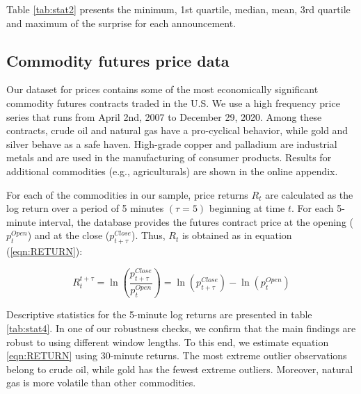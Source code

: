 \documentclass[12pt]{article}
\begin{document}
Table \ref{tab:stat2} presents the minimum, 1st quartile, median, mean, 3rd quartile and maximum of the surprise for each announcement. 



\subsection{Commodity futures price data}

Our dataset for prices contains some of the most economically significant commodity futures contracts traded in the U.S. We use a high frequency price series that runs from April 2nd, 2007 to December 29, 2020. Among these contracts, crude oil and natural gas have a pro-cyclical behavior, while gold and silver behave as a safe haven. High-grade copper and palladium are industrial metals and are used in the manufacturing of consumer products. Results for additional commodities (e.g., agriculturals) are shown in the online appendix.


For each of the commodities in our sample, price returns $R_t$ are calculated as the log return over a period of 5 minutes $(\tau=5)$ beginning at time $t$. For each 5-minute interval, the database provides the futures contract price at the opening ($p_{t}^{Open}$)  and at the close ($p_{t+\tau}^{Close}$). Thus, $R_t$ is obtained  as in equation (\ref{eqn:RETURN}):

\begin{equation}\label{eqn:RETURN}
R_t^{t+\tau}=\ln \left( \frac{p_{t+\tau}^{Close}}{p_{t}^{Open}} \right)=\ln (p_{t+\tau}^{Close})-\ln(p_{t}^{Open})
\end{equation}

Descriptive statistics for the 5-minute log returns are presented in table \ref{tab:stat4}. In one of our robustness checks, we confirm that the main findings are robust to using different window lengths. To this end, we estimate equation \ref{eqn:RETURN}  using 30-minute returns.  The most extreme outlier observations belong to crude oil, while gold has the fewest extreme outliers. Moreover, natural gas is more volatile than other commodities. %

\end{document}
